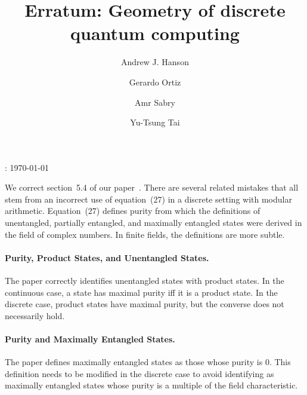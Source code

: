 \documentclass{iopart}
\begin{document}
\title{Erratum: Geometry of discrete quantum computing}


\author{Andrew J. Hanson}


\address{School of Informatics and Computing, Indiana University, Bloomington,
IN 47405, U.S.A}


\author{Gerardo Ortiz}


\address{Department of Physics, Indiana University, Bloomington, IN 47405,
U.S.A}


\author{Amr Sabry}


\address{School of Informatics and Computing, Indiana University, Bloomington,
IN 47405, U.S.A}


\author{Yu-Tsung Tai}


\address{Department of Mathematics, Indiana University, Bloomington, IN 47405,
U.S.A}


\address{School of Informatics and Computing, Indiana University, Bloomington,
IN 47405, U.S.A}


: {\today}

\maketitle

\noindent We correct section~5.4 of our paper~\cite{geometry}. There are several related mistakes that all stem from an incorrect use of equation~(27) in a discrete setting with modular arithmetic. Equation~(27) defines purity from which the definitions of unentangled, partially entangled, and maximally entangled states were derived in the field of complex numbers. In finite fields, the definitions are more subtle.
\paragraph*{Purity, Product States, and Unentangled States.} The paper correctly identifies unentangled states with product states. In the continuous case, a state has maximal purity iff it is a product state. In the discrete case, product states have maximal purity, but the converse does not necessarily hold. 
\paragraph*{Purity and Maximally Entangled States.} The paper defines maximally entangled states as those whose purity is 0. This definition needs to be modified in the discrete case to avoid identifying as maximally entangled states whose purity is a multiple of the field characteristic.
\end{document}
